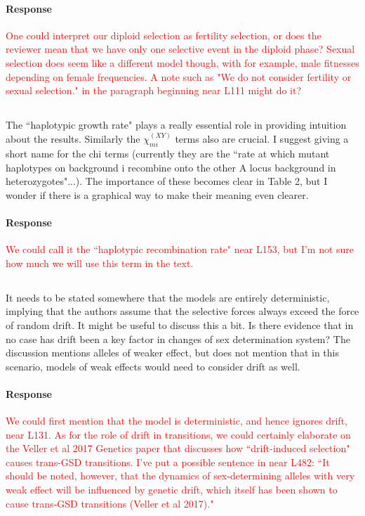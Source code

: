 \documentclass[10pt,letterpaper]{article}
\begin{document}
\noindent\paragraph{Response}
\textcolor{red}{One could interpret our diploid selection as fertility selection, or does the reviewer mean that we have only one selective event in the diploid phase? Sexual selection does seem like a different model though, with for example, male fitnesses depending on female frequencies. A note such as "We do not consider fertility or sexual selection." in the paragraph beginning near L111 might do it?}

\noindent\subsection{}
The ``haplotypic growth rate" plays a really essential role in providing intuition about the results. Similarly the $\chi_{mi}^{(XY)}$ terms also are crucial.  I suggest giving a short name for the chi terms (currently they are the ``rate at which mutant haplotypes on background i recombine onto the other A locus background in heterozygotes"...).   The importance of these becomes clear in Table 2, but I wonder if there is a graphical way to make their meaning even clearer.  

\noindent\paragraph{Response}
\textcolor{red}{We could call it the ``haplotypic recombination rate" near L153, but I'm not sure how much we will use this term in the text.}

\noindent\subsection{}
It needs to be stated somewhere that the models are entirely deterministic, implying that the authors assume that the selective forces always exceed the force of random drift. It might be useful to discuss this a bit. Is there evidence that in no case has drift been a key factor in changes of sex determination system?  The discussion mentions alleles of weaker effect, but does not mention that in this scenario, models of weak effects would need to consider drift as well.

\noindent\paragraph{Response}
\textcolor{red}{We could first mention that the model is deterministic, and hence ignores drift, near L131. As for the role of drift in transitions, we could certainly elaborate on the Veller et al 2017 Genetics paper that discusses how ``drift-induced selection" causes trans-GSD transitions. I've put a possible sentence in near L482: ``It should be noted, however, that the dynamics of sex-determining alleles with very weak effect will be influenced by genetic drift, which itself has been shown to cause trans-GSD transitions (Veller et al 2017)."}
\end{document}
